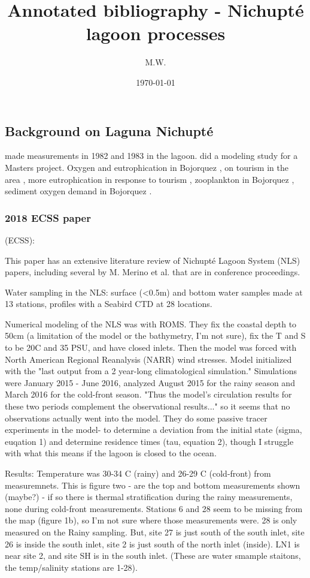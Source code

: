 \documentclass[11pt]{article}
\begin{document}
\title{Annotated bibliography - Nichupt{\'e} lagoon processes}
\author{M.W.}
\date{\today}
\maketitle

\subsection*{Background on Laguna Nichupt{\'e}}

\citet{merino90} made measurements in 1982 and 1983 in the lagoon. \citet{pedrozoacuna08} did a modeling study for a Masters project. Oxygen and eutrophication in Bojorquez \citep{reyes91}, on tourism in the area \citep{torres05}, more eutrophication in response to tourism \citep{merino92}, zooplankton in Bojorquez \citep{alvarezcadena96}, sediment oxygen demand in Bojorquez \citep{valdeslozano06}.

\subsubsection{2018 ECSS paper}
\citet{romerosierra18} (ECSS): 

This paper has an extensive literature review of Nichupté Lagoon System (NLS) papers, including several by M. Merino et al. that are in conference proceedings. 

Water sampling in the NLS: surface (<0.5m) and bottom water samples made at 13 stations, profiles with a Seabird CTD at 28 locations. 

Numerical modeling of the NLS was with ROMS. They fix the coastal depth to 50cm (a limitation of the model or the bathymetry, I'm not sure), fix the T and S to be 20C and 35 PSU, and have closed inlets. Then the model was forced with North American Regional Reanalysis (NARR) wind stresses. Model initialized with the "last output from a 2 year-long climatological simulation." Simulations were January 2015 - June 2016, analyzed August 2015 for the rainy season and March 2016 for the cold-front season. "Thus the model's circulation results for these two periods complement the observational results..." so it seems that no observations actually went into the model. They do some passive tracer experiments in the model- to determine a deviation from the initial state (sigma, euqation 1) and determine residence times (tau, equation 2), though I struggle with what this means if the lagoon is closed to the ocean. 

Results: Temperature was 30-34 C (rainy) and 26-29 C (cold-front) from measuremnets. This is figure two - are the top and bottom measurements shown (maybe?) - if so there is thermal stratification during the rainy measurements, none during cold-front measurements. Stations 6 and 28 seem to be missing from the map (figure 1b), so I'm not sure where those measurements were. 28 is only measured on the Rainy sampling. But, site 27 is just south of the south inlet, site 26 is inside the south inlet, site 2 is just south of the north inlet (inside). LN1 is near site 2, and site SH is in the south inlet. (These are water smample staitons, the temp/salinity stations are 1-28).
\end{document}
